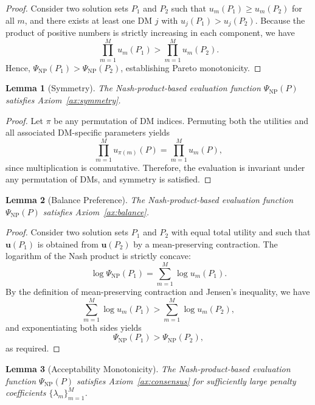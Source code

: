 \documentclass[journal]{IEEEtran}
\newtheorem{lemma}{Lemma}
\begin{document}
\begin{proof}
	Consider two solution sets $P_1$ and $P_2$ such that $u_m(P_1) \ge u_m(P_2)$ for all $m$, and there exists at least one DM $j$ with $u_j(P_1) > u_j(P_2)$.  
	Because the product of positive numbers is strictly increasing in each component, we have
	\[
	\prod_{m=1}^{M} u_m(P_1) > \prod_{m=1}^{M} u_m(P_2).
	\]
	Hence, $\Psi_{\mathrm{NP}}(P_1) > \Psi_{\mathrm{NP}}(P_2)$, establishing Pareto monotonicity.
\end{proof}

\begin{lemma}[Symmetry]
	\label{thm:symmetry}
	The Nash-product-based evaluation function $\Psi_{\mathrm{NP}}(P)$ satisfies Axiom~\ref{ax:symmetry}.
\end{lemma}

\begin{proof}
	Let $\pi$ be any permutation of DM indices. Permuting both the utilities and all associated DM-specific parameters yields
	\[
	\prod_{m=1}^{M} u_{\pi(m)}(P) = \prod_{m=1}^{M} u_m(P),
	\]
	since multiplication is commutative. Therefore, the evaluation is invariant under any permutation of DMs, and symmetry is satisfied.
\end{proof}

\begin{lemma}[Balance Preference]
	\label{thm:balance}
	The Nash-product-based evaluation function $\Psi_{\mathrm{NP}}(P)$ satisfies Axiom~\ref{ax:balance}.
\end{lemma}

\begin{proof}
	Consider two solution sets $P_1$ and $P_2$ with equal total utility and such that $\mathbf{u}(P_1)$ is obtained from $\mathbf{u}(P_2)$ by a mean-preserving contraction.  
	The logarithm of the Nash product is strictly concave:
	\[
	\log \Psi_{\mathrm{NP}}(P_1) = \sum_{m=1}^{M} \log u_m(P_1).
	\]
	By the definition of mean-preserving contraction and Jensen's inequality, we have
	\[
	\sum_{m=1}^{M} \log u_m(P_1) > \sum_{m=1}^{M} \log u_m(P_2),
	\]
	and exponentiating both sides yields
	\[
	\Psi_{\mathrm{NP}}(P_1) > \Psi_{\mathrm{NP}}(P_2),
	\]
	as required.
\end{proof}

\begin{lemma}[Acceptability Monotonicity]
	\label{thm:acceptability}
	The Nash-product-based evaluation function $\Psi_{\mathrm{NP}}(P)$ satisfies Axiom~\ref{ax:consensus} for sufficiently large penalty coefficients $\{\lambda_m\}_{m=1}^M$.
\end{lemma}
\end{document}
